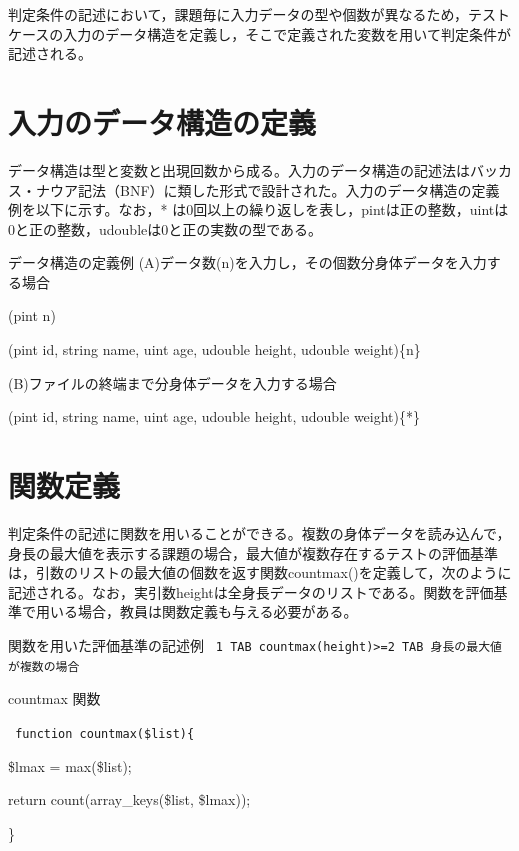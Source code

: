 \documentclass{tpu-sotu}
\begin{document}
判定条件の記述において，課題毎に入力データの型や個数が異なるため，テストケースの入力のデータ構造を定義し，そこで定義された変数を用いて判定条件が記述される。
\section{入力のデータ構造の定義}
データ構造は型と変数と出現回数から成る。入力のデータ構造の記述法はバッカス・ナウア記法（BNF）に類した形式で設計された。入力のデータ構造の定義例を以下に示す。なお，* は0回以上の繰り返しを表し，pintは正の整数，uintは0と正の整数，udoubleは0と正の実数の型である。\\
\begin{minipage}[b]{\textwidth}
\begin{itembox}[l]{データ構造の定義例}
(A)データ数(n)を入力し，その個数分身体データを入力する場合
{\tt

(pint n)

(pint id, string name, uint age, udouble height, udouble weight)\{n\}
}

(B)ファイルの終端まで分身体データを入力する場合
{\tt

(pint id, string name, uint age, udouble height, udouble weight)\{*\}
}

\end{itembox}
\end{minipage}

\section{関数定義}
判定条件の記述に関数を用いることができる。複数の身体データを読み込んで，身長の最大値を表示する課題の場合，最大値が複数存在するテストの評価基準は，引数のリストの最大値の個数を返す関数countmax()を定義して，次のように記述される。なお，実引数heightは全身長データのリストである。関数を評価基準で用いる場合，教員は関数定義も与える必要がある。\\
\begin{minipage}[b]{\textwidth}
\begin{itembox}[l]{関数を用いた評価基準の記述例}
{\tt
1 TAB countmax(height)>=2 TAB 身長の最大値が複数の場合
}
\end{itembox}
\end{minipage}
\begin{minipage}[b]{\textwidth}
\begin{itembox}[l]{countmax 関数}
{\tt
function countmax(\$list)\{

	\$lmax = max(\$list);

	return count(array\_keys(\$list, \$lmax));

\}
}
\end{itembox}
\end{minipage}
\end{document}
